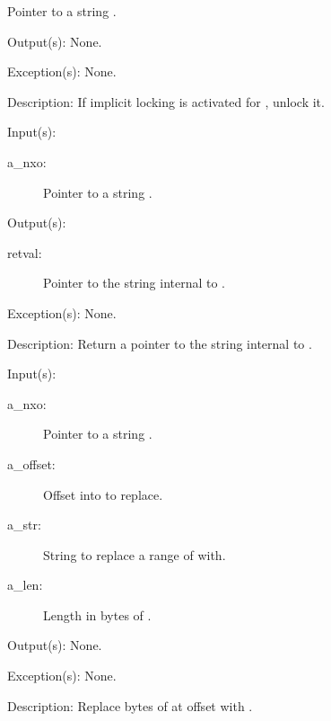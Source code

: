 \begin{capi}
\begin{capilist}
\begin{description}
			Pointer to a string .
		\end{description}
	\item[Output(s): ] None.
	\item[Exception(s): ] None.
	\item[Description: ]
		If implicit locking is activated for , unlock it.
	\end{capilist}
\label{nxo_string_get}
	\begin{capilist}
	\item[Input(s): ]
		\begin{description}\item[]
		\item[a\_nxo: ]
			Pointer to a string .
		\end{description}
	\item[Output(s): ]
		\begin{description}\item[]
		\item[retval: ]
			Pointer to the string internal to .
		\end{description}
	\item[Exception(s): ] None.
	\item[Description: ]
		Return a pointer to the string internal to .
	\end{capilist}
\label{nxo_string_set}
	\begin{capilist}
	\item[Input(s): ]
		\begin{description}\item[]
		\item[a\_nxo: ]
			Pointer to a string \classname{nxo}.
		\item[a\_offset: ]
			Offset into  to replace.
		\item[a\_str: ]
			String to replace a range of \cvar{a\_nxo} with.
		\item[a\_len: ]
			Length in bytes of \cvar{a\_str}.
		\end{description}
	\item[Output(s): ] None.
	\item[Exception(s): ] None.
	\item[Description: ]
		Replace  bytes of  at offset
		 with \cvar{a\_str}.
	\end{capilist}
\end{capi}
